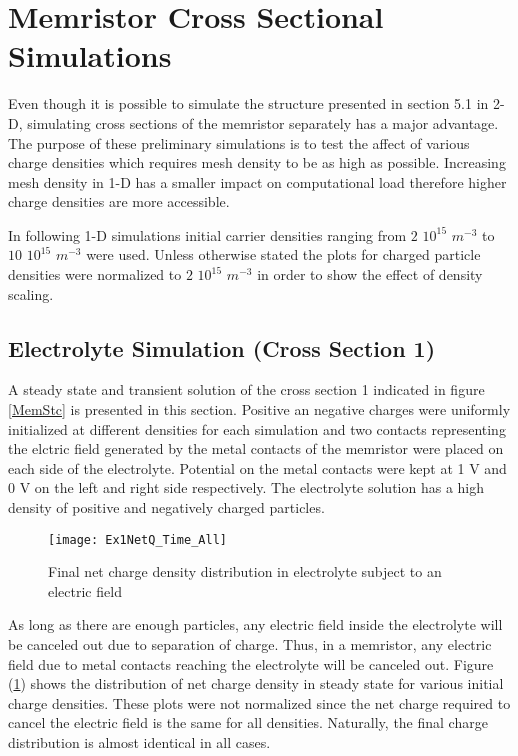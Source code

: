 \clearpage
\section{Memristor Cross Sectional Simulations}

Even though it is possible to simulate the structure presented in section 5.1 in 2-D, simulating cross sections of the memristor separately has a major advantage. The purpose of these preliminary  simulations is to test the affect of various charge densities which requires mesh density to be as high as possible. Increasing mesh density in 1-D has a smaller impact on computational load therefore higher charge densities are more accessible.  

In following 1-D simulations initial carrier densities ranging from $2$ $10^{15}$ $m^{-3}$ to $10$ $10^{15}$ $m^{-3}$ were used. Unless otherwise stated the plots for charged particle densities were normalized to $2$ $10^{15}$ $m^{-3}$ in order to show the effect of density scaling. 

\subsection{Electrolyte Simulation (Cross Section 1)}

A steady state and transient solution of the cross section 1 indicated in figure \ref{MemStc} is presented in this section. Positive an negative charges were uniformly initialized at different densities for each simulation and two contacts representing the elctric field generated by the metal contacts of the memristor were placed on each side of the electrolyte. Potential on the metal contacts were kept at 1 V and 0 V on the left and right side respectively. The electrolyte solution has a high density of positive and negatively charged particles.

\begin{figure}[htp]
\centering
\texttt{[image: Ex1NetQ\_Time\_All]}
\caption{Final net charge density distribution in electrolyte subject to an electric field} 
\label{ElectrolyteQ}
\end{figure}

 As long as there are enough particles, any electric field inside the electrolyte will be canceled out due to separation of charge. Thus, in a memristor, any electric field due to metal contacts reaching the electrolyte will be canceled out. Figure (\ref{ElectrolyteQ}) shows the distribution of net charge density in steady state for various initial charge densities.  These plots were not normalized since the net charge required to cancel the electric field is the same for all densities. Naturally, the final charge distribution is almost identical in all cases.



